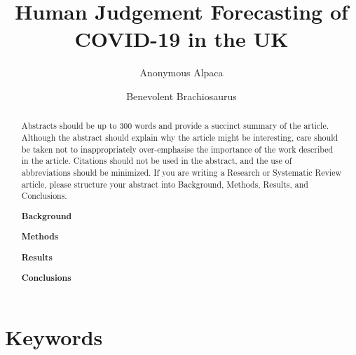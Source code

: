\documentclass[10pt,a4paper,twocolumn]{article}
\begin{document}
\title{Human Judgement Forecasting of COVID-19 in the UK}


\author[1, 2, 3]{Anonymous Alpaca}
\author[2]{Benevolent Brachiosaurus}


\maketitle
\thispagestyle{fancy}




\begin{abstract}

Abstracts should be up to 300 words and provide a succinct summary of the article. Although the abstract should explain why the article might be interesting, care should be taken not to inappropriately over-emphasise the importance of the work described in the article. Citations should not be used in the abstract, and the use of abbreviations should be minimized. If you are writing a Research or Systematic Review article, please structure your abstract into Background, Methods, Results, and Conclusions.

\textbf{Background}

\textbf{Methods}

\textbf{Results}

\textbf{Conclusions}



\end{abstract}

\section*{Keywords}
\end{document}
